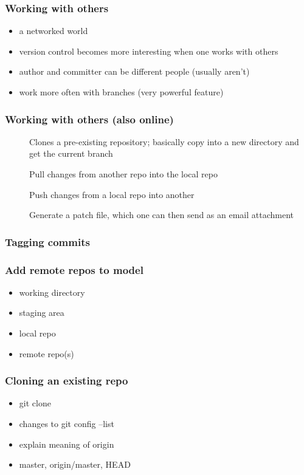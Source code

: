\documentclass{git_course}
\begin{document}
\begin{frame}
\frametitle{Working with others}
\begin{itemize}
    \item a networked world
    \item version control becomes more interesting when one works with
        others
    \item author and committer can be different people (usually aren't)
    \item work more often with branches (very powerful feature)
\end{itemize}
\end{frame}

\begin{frame}
\frametitle{Working with others (also online)}

\begin{description}
    \item[] Clones a pre-existing repository; basically copy
        into a new directory and get the current branch
    \item[] Pull changes from another repo into the local repo
    \item[] Push changes from a local repo into another
    \item[] Generate a patch file, which one can
        then send as an email attachment
\end{description}
\end{frame}

\begin{frame}
\frametitle{Tagging commits}
\end{frame}

\begin{frame}
\frametitle{Add remote repos to model}
\begin{itemize}
    \item working directory
    \item staging area
    \item local repo
    \item remote repo(s)
\end{itemize}
\end{frame}

\begin{frame}
\frametitle{Cloning an existing repo}
\begin{itemize}
    \item git clone
    \item changes to git config --list
    \item explain meaning of origin
    \item master, origin/master, HEAD
\end{itemize}
\end{frame}
\end{document}
